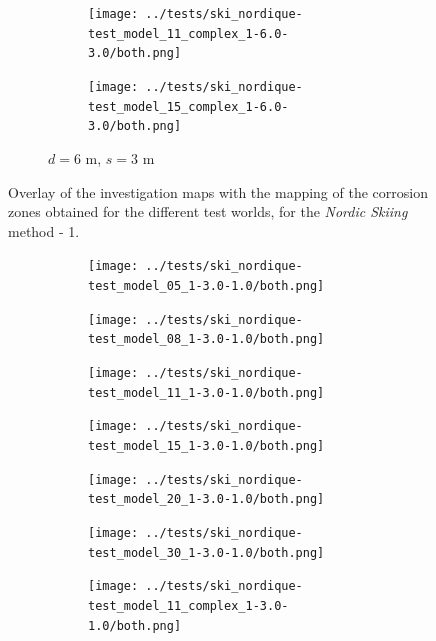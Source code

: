\documentclass[english,RandD]{rapportPFE}  %
\begin{document}
\begin{figure}[H]
\begin{subfigure}[t]{\linewidth}
\begin{subfigure}[t]{0.11\linewidth}
					\texttt{[image: ../tests/ski\_nordique-test\_model\_11\_complex\_1-6.0-3.0/both.png]}
				\end{subfigure}
				\hfill
				\begin{subfigure}[t]{0.11\linewidth}
					\texttt{[image: ../tests/ski\_nordique-test\_model\_15\_complex\_1-6.0-3.0/both.png]}
				\end{subfigure}
				\caption{$d = 6$ m, $s = 3$ m}
			\end{subfigure}
			\caption{Overlay of the investigation maps with the mapping of the corrosion zones obtained for the different test worlds, for the \textit{Nordic Skiing} method - 1.}
			\label{fig:ski_nordique_resultats}
		\end{figure}

		\begin{figure}[H]
			\centering
			\begin{subfigure}[t]{\linewidth}
				\centering
				\begin{subfigure}[t]{0.11\linewidth}
					\texttt{[image: ../tests/ski\_nordique-test\_model\_05\_1-3.0-1.0/both.png]}
				\end{subfigure}
				\hfill
				\begin{subfigure}[t]{0.11\linewidth}
					\texttt{[image: ../tests/ski\_nordique-test\_model\_08\_1-3.0-1.0/both.png]}
				\end{subfigure}
				\hfill
				\begin{subfigure}[t]{0.11\linewidth}
					\texttt{[image: ../tests/ski\_nordique-test\_model\_11\_1-3.0-1.0/both.png]}
				\end{subfigure}
				\hfill
				\begin{subfigure}[t]{0.11\linewidth}
					\texttt{[image: ../tests/ski\_nordique-test\_model\_15\_1-3.0-1.0/both.png]}
				\end{subfigure}
				\hfill
				\begin{subfigure}[t]{0.11\linewidth}
					\texttt{[image: ../tests/ski\_nordique-test\_model\_20\_1-3.0-1.0/both.png]}
				\end{subfigure}
				\hfill
				\begin{subfigure}[t]{0.11\linewidth}
					\texttt{[image: ../tests/ski\_nordique-test\_model\_30\_1-3.0-1.0/both.png]}
				\end{subfigure}
				\hfill
				\begin{subfigure}[t]{0.11\linewidth}
					\texttt{[image: ../tests/ski\_nordique-test\_model\_11\_complex\_1-3.0-1.0/both.png]}
				\end{subfigure}
				\hfill

\end{subfigure}
\end{figure}
\end{document}
